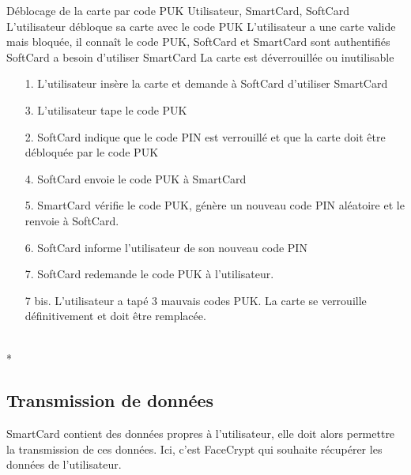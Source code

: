 \documentclass[a4paper,11pt,french]{article}
\begin{document}
\fiche
{Déblocage de la carte par code PUK}
	{Utilisateur, SmartCard, SoftCard}
    {L'utilisateur débloque sa carte avec le code PUK}
	{L'utilisateur a une carte valide mais bloquée, il connaît le code PUK, 
    SoftCard et SmartCard sont authentifiés}
    {SoftCard a besoin d'utiliser SmartCard}
    {La carte est déverrouillée ou inutilisable}
	{\begin{itemize}
	    \item[]
	  \item[1.] L'utilisateur insère la carte et demande à SoftCard 
          d'utiliser SmartCard
      \item[3.] L'utilisateur tape le code PUK
	\end{itemize}
	}
	{\begin{itemize}
        \item[]
		\item[2.] SoftCard indique que le code PIN est verrouillé et que la 
            carte doit être débloquée par le code PUK
		\item[4.] SoftCard envoie le code PUK à SmartCard
		\item[5.] SmartCard vérifie le code PUK, génère un nouveau code PIN 
            aléatoire et le renvoie à SoftCard.
        \item[6.] SoftCard informe l’utilisateur de son nouveau code PIN
	\end{itemize}
	}
	{}
\flots
{\begin{itemize}
        \item[]
        \item[7.] SoftCard redemande le code PUK à l'utilisateur.
\end{itemize}}
    {\begin{itemize}
    \item[]
    \item[7 bis.] L'utilisateur a tapé 3 mauvais codes PUK. La carte se verrouille
        définitivement et doit être remplacée.
    \end{itemize}
    }
	{}    
\\*

\subsection{Transmission de données}
SmartCard contient des données propres à l'utilisateur, elle doit alors 
permettre la transmission de ces  données. Ici, c'est FaceCrypt qui souhaite 
récupérer les données de l'utilisateur.\\
\end{document}
